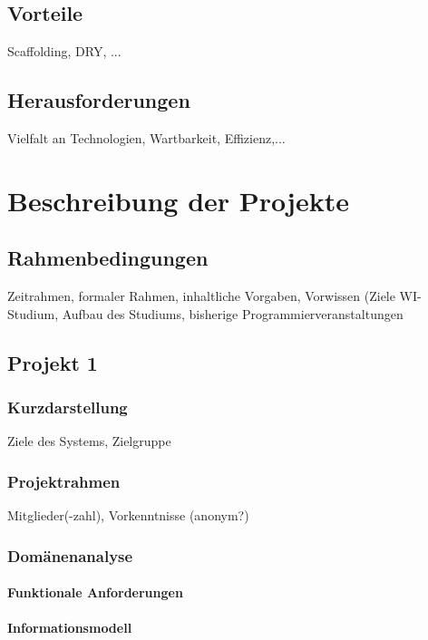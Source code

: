 \documentclass[11pt,a4paper,ngerman]{book}
\begin{document}
\section{Vorteile}
Scaffolding, DRY, ...

\section{Herausforderungen}
Vielfalt an Technologien, Wartbarkeit, Effizienz,...



\chapter{Beschreibung der Projekte}

\section{Rahmenbedingungen}
Zeitrahmen, formaler Rahmen, inhaltliche Vorgaben, Vorwissen (Ziele WI-Studium, Aufbau des Studiums, bisherige Programmierveranstaltungen


\section{Projekt 1}

\subsection{Kurzdarstellung}
Ziele des Systems, Zielgruppe

\subsection{Projektrahmen}
Mitglieder(-zahl), Vorkenntnisse (anonym?)

\subsection{Domänenanalyse}
\subsubsection{Funktionale Anforderungen}
\subsubsection{Informationsmodell}
\end{document}
